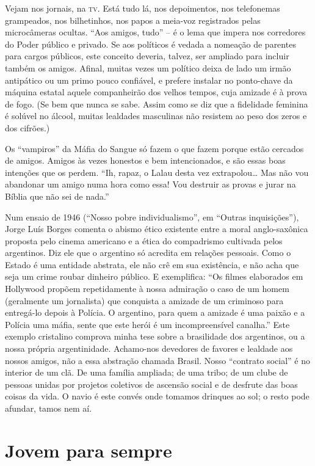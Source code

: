 Vejam nos jornais, na \textsc{tv}. Está tudo lá, nos depoimentos, nos
telefonemas grampeados, nos bilhetinhos, nos papos a meia-voz
registrados pelas microcâmeras ocultas. “Aos amigos, tudo” -- é o lema
que impera nos corredores do Poder público e privado. Se aos
políticos é vedada a nomeação de parentes para cargos públicos, este
conceito deveria, talvez, ser ampliado para incluir também os amigos.
Afinal, muitas vezes um político deixa de lado um irmão antipático ou
um primo pouco confiável, e prefere instalar no ponto-chave da
máquina estatal aquele companheirão dos velhos tempos, cuja amizade é
à prova de fogo. (Se bem que nunca se sabe. Assim como se diz que a
fidelidade feminina é solúvel no álcool, muitas lealdades masculinas
não resistem ao peso dos zeros e dos cifrões.)

Os “vampiros” da Máfia do Sangue só fazem o que fazem porque estão
cercados de amigos. Amigos às vezes honestos e bem intencionados, e
são essas boas intenções que os perdem. “Ih, rapaz, o Lalau desta vez
extrapolou… Mas não vou abandonar um amigo numa hora como essa! Vou
destruir as provas e jurar na Bíblia que não sei de nada.”

Num ensaio de 1946 (“Nosso pobre individualismo”, em “Outras
inquisições”), Jorge Luís Borges comenta o abismo ético existente
entre a moral anglo-saxônica proposta pelo cinema americano e a ética
do compadrismo cultivada pelos argentinos.  Diz ele que o argentino
só acredita em relações pessoais. Como o Estado é uma entidade
abstrata, ele não crê em sua existência, e não acha que seja um crime
roubar dinheiro público. E exemplifica: “Os filmes elaborados em
Hollywood propõem repetidamente à nossa admiração o caso de um homem
(geralmente um jornalista) que conquista a amizade de um criminoso
para entregá-lo depois à Polícia. O argentino, para quem a amizade é
uma paixão e a Polícia uma máfia, sente que este herói é um
incompreensível canalha.” Este exemplo cristalino comprova minha tese
sobre a brasilidade dos argentinos, ou a nossa própria argentinidade.
Achamo-nos devedores de favores e lealdade aos nossos amigos, não a
essa abstração chamada Brasil.  Nosso “contrato social” é no interior
de um clã. De uma família ampliada; de uma tribo; de um clube de
pessoas unidas por projetos coletivos de ascensão social e de
desfrute das boas coisas da vida.  O navio é este convés onde tomamos
drinques ao sol; o resto pode afundar, tamos nem aí.

\chapter{Jovem para sempre}

